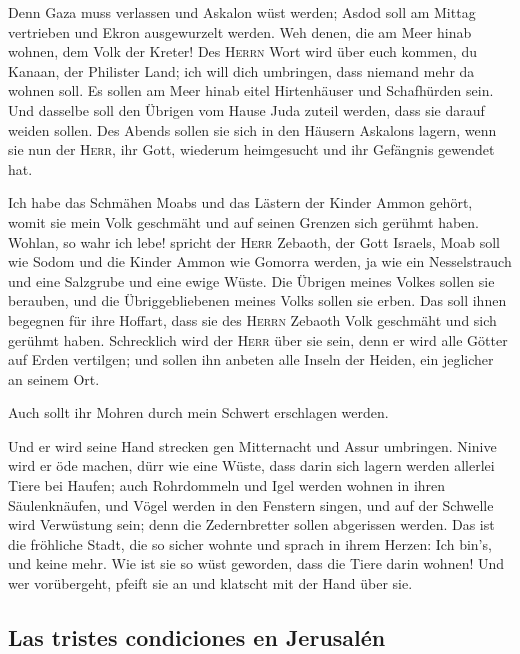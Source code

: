  Denn Gaza muss verlassen und Askalon wüst werden; Asdod
soll am Mittag vertrieben und Ekron ausgewurzelt werden. 
Weh denen, die am Meer hinab wohnen, dem Volk der Kreter! Des
\textsc{Herrn} Wort wird über euch kommen, du Kanaan, der Philister
Land; ich will dich umbringen, dass niemand mehr da wohnen soll.
 Es sollen am Meer hinab eitel Hirtenhäuser und
Schafhürden sein.  Und dasselbe soll den Übrigen vom Hause
Juda zuteil werden, dass sie darauf weiden sollen. Des Abends sollen sie
sich in den Häusern Askalons lagern, wenn sie nun der \textsc{Herr}, ihr
Gott, wiederum heimgesucht und ihr Gefängnis gewendet hat.

 Ich habe das Schmähen Moabs und das Lästern der Kinder
Ammon gehört, womit sie mein Volk geschmäht und auf seinen Grenzen sich
gerühmt haben.  Wohlan, so wahr ich lebe! spricht der
\textsc{Herr} Zebaoth, der Gott Israels, Moab soll wie Sodom und die
Kinder Ammon wie Gomorra werden, ja wie ein Nesselstrauch und eine
Salzgrube und eine ewige Wüste. Die Übrigen meines Volkes sollen sie
berauben, und die Übriggebliebenen meines Volks sollen sie erben.
 Das soll ihnen begegnen für ihre Hoffart, dass sie des
\textsc{Herrn} Zebaoth Volk geschmäht und sich gerühmt haben.
 Schrecklich wird der \textsc{Herr} über sie sein, denn
er wird alle Götter auf Erden vertilgen; und sollen ihn anbeten alle
Inseln der Heiden, ein jeglicher an seinem Ort.

 Auch sollt ihr Mohren durch mein Schwert erschlagen
werden.

 Und er wird seine Hand strecken gen Mitternacht und
Assur umbringen. Ninive wird er öde machen, dürr wie eine Wüste,
 dass darin sich lagern werden allerlei Tiere bei Haufen;
auch Rohrdommeln und Igel werden wohnen in ihren Säulenknäufen, und
Vögel werden in den Fenstern singen, und auf der Schwelle wird
Verwüstung sein; denn die Zedernbretter sollen abgerissen werden.
 Das ist die fröhliche Stadt, die so sicher wohnte und
sprach in ihrem Herzen: Ich bin's, und keine mehr. Wie ist sie so wüst
geworden, dass die Tiere darin wohnen! Und wer vorübergeht, pfeift sie
an und klatscht mit der Hand über sie.

\hypertarget{las-tristes-condiciones-en-jerusaluxe9n}{%
\subsection{Las tristes condiciones en
Jerusalén}\label{las-tristes-condiciones-en-jerusaluxe9n}}

